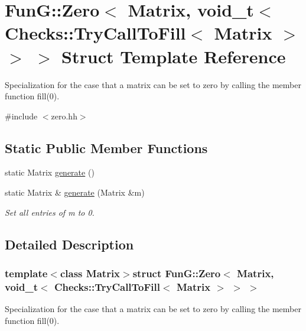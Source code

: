 \hypertarget{structFunG_1_1Zero_3_01Matrix_00_01void__t_3_01Checks_1_1TryCallToFill_3_01Matrix_01_4_01_4_01_4}{}\section{Fun\+G\+:\+:Zero$<$ Matrix, void\+\_\+t$<$ Checks\+:\+:Try\+Call\+To\+Fill$<$ Matrix $>$ $>$ $>$ Struct Template Reference}
\label{structFunG_1_1Zero_3_01Matrix_00_01void__t_3_01Checks_1_1TryCallToFill_3_01Matrix_01_4_01_4_01_4}


Specialization for the case that a matrix can be set to zero by calling the member function fill(0).  




{\ttfamily \#include $<$zero.\+hh$>$}

\subsection*{Static Public Member Functions}
\begin{DoxyCompactItemize}
\item 
static Matrix \hyperlink{structFunG_1_1Zero_3_01Matrix_00_01void__t_3_01Checks_1_1TryCallToFill_3_01Matrix_01_4_01_4_01_4_aad40134e73459a1e0a86c5bb8ceee730}{generate} ()
\item 
static Matrix \& \hyperlink{structFunG_1_1Zero_3_01Matrix_00_01void__t_3_01Checks_1_1TryCallToFill_3_01Matrix_01_4_01_4_01_4_a929e1d03c899d4badbb7a3f6fa701e8c}{generate} (Matrix \&m)
\begin{DoxyCompactList}\small\item\em Set all entries of m to 0. \end{DoxyCompactList}\end{DoxyCompactItemize}


\subsection{Detailed Description}
\subsubsection*{template$<$class Matrix$>$struct Fun\+G\+::\+Zero$<$ Matrix, void\+\_\+t$<$ Checks\+::\+Try\+Call\+To\+Fill$<$ Matrix $>$ $>$ $>$}

Specialization for the case that a matrix can be set to zero by calling the member function fill(0). 

